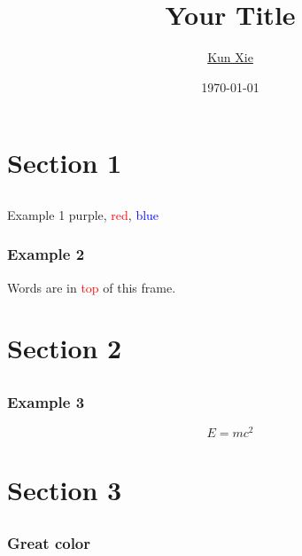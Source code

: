 \documentclass{beamer}
\institute{
    Department of Industrial Engineering \\
    and Logistics Management
}
\author{\href{https://cnxiekun.github.io/kxie/}{Kun Xie}}
\title{Your Title}
\date{\today}
\theoremstyle{plain}
\newcommand{\red}[1]{\textcolor{red}{#1}} %
\newcommand{\purple}[1]{\textcolor{myPrince}{#1}} %
\newcommand{\blue}[1]{\textcolor{blue}{#1}} %
\begin{document}
\begin{frame}[plain]
    \titlepage
\end{frame}


\section{Section 1}
\subsection{}

\begin{frame}{Example 1}
    \purple{purple}, \red{red}, \blue{blue}
\end{frame}

\begin{frame}[t]\frametitle{Example 2}
    Words are in \red{top} of this frame.
\end{frame}


\section{Section 2}
\subsection{}

\begin{frame}[t]\frametitle{Example 3}
    \begin{Theorem}
        \begin{equation*}
            E = m c ^2
        \end{equation*}
    \end{Theorem}
\end{frame}



\section{Section 3}
\subsection{}

\begin{frame}\frametitle{\purple{Great color}}
    
\end{frame}
\end{document}
